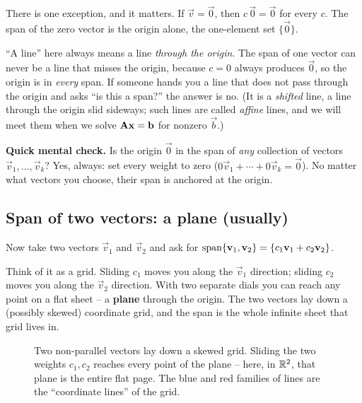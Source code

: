 There is one exception, and it matters. If $\vec{v} = \vec{0}$, then $c\,\vec{0} = \vec{0}$ for every $c$. The span of the zero vector is the origin alone, the one-element set $\{\vec{0}\}$.

\begin{trapbox}
``A line'' here always means a line \emph{through the origin}. The span of one vector can never be a line that misses the origin, because $c=0$ always produces $\vec{0}$, so the origin is in \emph{every} span. If someone hands you a line that does not pass through the origin and asks ``is this a span?'' the answer is no. (It is a \emph{shifted} line, a line through the origin slid sideways; such lines are called \emph{affine} lines, and we will meet them when we solve $\mathbf{A}\mathbf{x}=\mathbf{b}$ for nonzero $\vec{b}$.)
\end{trapbox}

\textbf{Quick mental check.} Is the origin $\vec{0}$ in the span of \emph{any} collection of vectors $\vec{v}_1,\dots,\vec{v}_k$? Yes, always: set every weight to zero ($0\vec{v}_1 + \cdots + 0\vec{v}_k = \vec{0}$). No matter what vectors you choose, their span is anchored at the origin.

\subsection{Span of two vectors: a plane (usually)}

Now take two vectors $\vec{v}_1$ and $\vec{v}_2$ and ask for $\operatorname{span}\{\mathbf{v}_1,\mathbf{v}_2\} = \{c_1\mathbf{v}_1 + c_2\mathbf{v}_2\}$.

Think of it as a grid. Sliding $c_1$ moves you along the $\vec{v}_1$ direction; sliding $c_2$ moves you along the $\vec{v}_2$ direction. With two separate dials you can reach any point on a flat sheet -- a \textbf{plane} through the origin. The two vectors lay down a (possibly skewed) coordinate grid, and the span is the whole infinite sheet that grid lives in.

\begin{figure}[H]
\centering
{}
\caption{Two non-parallel vectors lay down a skewed grid. Sliding the two weights $c_1,c_2$ reaches every point of the plane -- here, in $\mathbb{R}^2$, that plane is the entire flat page. The blue and red families of lines are the ``coordinate lines'' of the grid.}
\label{ch03:two-grid}
\end{figure}

